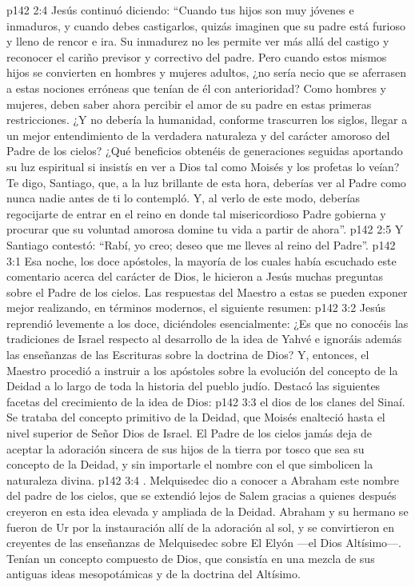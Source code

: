 \vs p142 2:4 \pc Jesús continuó diciendo: “Cuando tus hijos son muy jóvenes e inmaduros, y cuando debes castigarlos, quizás imaginen que su padre está furioso y lleno de rencor e ira. Su inmadurez no les permite ver más allá del castigo y reconocer el cariño previsor y correctivo del padre. Pero cuando estos mismos hijos se convierten en hombres y mujeres adultos, ¿no sería necio que se aferrasen a estas nociones erróneas que tenían de él con anterioridad? Como hombres y mujeres, deben saber ahora percibir el amor de su padre en estas primeras restricciones. ¿Y no debería la humanidad, conforme trascurren los siglos, llegar a un mejor entendimiento de la verdadera naturaleza y del carácter amoroso del Padre de los cielos? ¿Qué beneficios obtenéis de generaciones seguidas aportando su luz espiritual si insistís en ver a Dios tal como Moisés y los profetas lo veían? Te digo, Santiago, que, a la luz brillante de esta hora, deberías ver al Padre como nunca nadie antes de ti lo contempló. Y, al verlo de este modo, deberías regocijarte de entrar en el reino en donde tal misericordioso Padre gobierna y procurar que su voluntad amorosa domine tu vida a partir de ahora”.
\vs p142 2:5 Y Santiago contestó: “Rabí, yo creo; deseo que me lleves al reino del Padre”.
\vs p142 3:1 Esa noche, los doce apóstoles, la mayoría de los cuales había escuchado este comentario acerca del carácter de Dios, le hicieron a Jesús muchas preguntas sobre el Padre de los cielos. Las respuestas del Maestro a estas se pueden exponer mejor realizando, en términos modernos, el siguiente resumen:
\vs p142 3:2 Jesús reprendió levemente a los doce, diciéndoles esencialmente: ¿Es que no conocéis las tradiciones de Israel respecto al desarrollo de la idea de Yahvé e ignoráis además las enseñanzas de las Escrituras sobre la doctrina de Dios? Y, entonces, el Maestro procedió a instruir a los apóstoles sobre la evolución del concepto de la Deidad a lo largo de toda la historia del pueblo judío. Destacó las siguientes facetas del crecimiento de la idea de Dios:
\vs p142 3:3  el dios de los clanes del Sinaí. Se trataba del concepto primitivo de la Deidad, que Moisés enalteció hasta el nivel superior de Señor Dios de Israel. El Padre de los cielos jamás deja de aceptar la adoración sincera de sus hijos de la tierra por tosco que sea su concepto de la Deidad, y sin importarle el nombre con el que simbolicen la naturaleza divina.
\vs p142 3:4 . Melquisedec dio a conocer a Abraham este nombre del padre de los cielos, que se extendió lejos de Salem gracias a quienes después creyeron en esta idea elevada y ampliada de la Deidad. Abraham y su hermano se fueron de Ur por la instauración allí de la adoración al sol, y se convirtieron en creyentes de las enseñanzas de Melquisedec sobre El Elyón ---el Dios Altísimo---. Tenían un concepto compuesto de Dios, que consistía en una mezcla de sus antiguas ideas mesopotámicas y de la doctrina del Altísimo.
